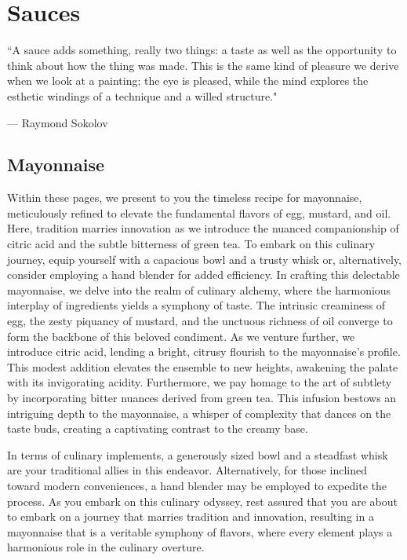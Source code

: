 \chapter{Sauces}
\epigraph{``A sauce adds something, really two things: a taste as well as the opportunity to think about how the thing was made. This is the same kind of pleasure we derive when we look at a painting; the eye is pleased, while the mind explores the esthetic windings of a technique and a willed structure."}{--- \textup{Raymond Sokolov}}

\clearpage
\section{Mayonnaise}
\label{mayonnaise}
Within these pages, we present to you the timeless recipe for mayonnaise, meticulously refined to elevate the fundamental flavors of egg, mustard, and oil. Here, tradition marries innovation as we introduce the nuanced companionship of citric acid and the subtle bitterness of green tea. To embark on this culinary journey, equip yourself with a capacious bowl and a trusty whisk or, alternatively, consider employing a hand blender for added efficiency. In crafting this delectable mayonnaise, we delve into the realm of culinary alchemy, where the harmonious interplay of ingredients yields a symphony of taste. The intrinsic creaminess of egg, the zesty piquancy of mustard, and the unctuous richness of oil converge to form the backbone of this beloved condiment. As we venture further, we introduce citric acid, lending a bright, citrusy flourish to the mayonnaise's profile. This modest addition elevates the ensemble to new heights, awakening the palate with its invigorating acidity. Furthermore, we pay homage to the art of subtlety by incorporating bitter nuances derived from green tea. This infusion bestows an intriguing depth to the mayonnaise, a whisper of complexity that dances on the taste buds, creating a captivating contrast to the creamy base.

In terms of culinary implements, a generously sized bowl and a steadfast whisk are your traditional allies in this endeavor. Alternatively, for those inclined toward modern conveniences, a hand blender may be employed to expedite the process. As you embark on this culinary odyssey, rest assured that you are about to embark on a journey that marries tradition and innovation, resulting in a mayonnaise that is a veritable symphony of flavors, where every element plays a harmonious role in the culinary overture.

